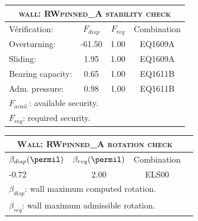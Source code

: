 \begin{center}
\begin{tabular}[H]{|l|c|c|c|}
\hline
\multicolumn{4}{|c|}{\textsc{wall: RWpinned_A stability check}}\\
\hline
Vérification:  & $F_{disp}$ & $F_{req}$ & Combination\\
\hline
Overturning:  & -61.50 & 1.00 & EQ1609A\\
Sliding:  & 1.95 & 1.00 & EQ1609A\\
Bearing capacity:  & 0.65 & 1.00 & EQ1611B\\
Adm. pressure:  & 0.98 & 1.00 & EQ1611B\\
\hline
\multicolumn{4}{|l|}{$F_{avail.}$: available security.}\\
\multicolumn{4}{|l|}{$F_{req}$: required security.}\\
\hline
\end{tabular}
\end{center}
\begin{center}
\begin{tabular}[H]{|l|c|c|c|}
\hline
\multicolumn{3}{|c|}{\textsc{Wall: RWpinned_A rotation check}}\\
\hline
$\beta_{disp} (\permil)$ & $\beta_{req}(\permil)$ & Combination\\
\hline
-0.72 & 2.00 & ELS00\\
\hline
\multicolumn{3}{|l|}{$\beta_{disp}$: wall maximum computed rotation.}\\
\multicolumn{3}{|l|}{$\beta_{req}$: wall maximum admissible rotation.}\\
\hline
\end{tabular}
\end{center}
 \label{tb_RWpinned_A}
\tablelasttail{\hline}
